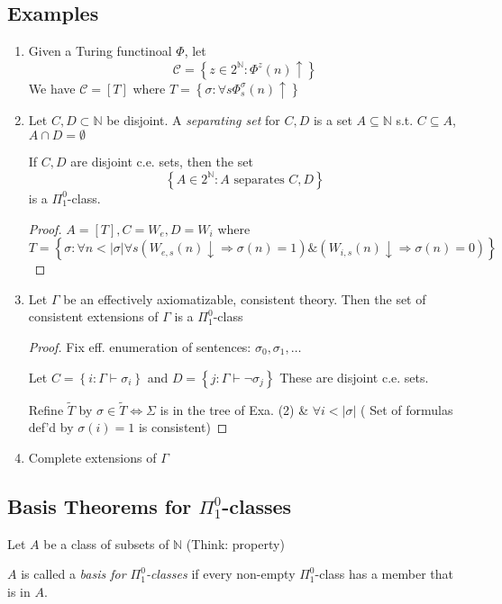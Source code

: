 \documentclass[12pt]{article}
\newcommand{\Nat}{\ensuremath{\mathbb{N}}}
\newcommand{\proves}{\vdash}
\begin{document}
\subsection{Examples}
\begin{enumerate}
  \item Given a Turing functinoal $\Phi$, let
\[
\mathcal{C} = \left\{ z \in 2^\Nat : \Phi^z(n) \uparrow \right\}
\]
We have $\mathcal{C} = [T]$ where $T = \left\{ \sigma:\forall s \Phi^\sigma_s(n) \uparrow \right\}$
  \item Let $C,D \subset \Nat$ be disjoint.
    A \emph{separating set} for $C,D$ is a set $A \subseteq \Nat$
    s.t. $C \subseteq A$, $A \cap D = \emptyset$

If $C,D$ are disjoint c.e. sets, then the set
\[
\left\{ A \in 2^\Nat : A \text{ separates } C,D \right\}
\]
is a $\Pi^0_1$-class.
\begin{proof}
  $A = [T], C = W_e, D = W_i $ where
  $T = \left\{ \sigma : \forall n < |\sigma| \forall s
  \left( W_{e,s}(n) \downarrow \Rightarrow \sigma(n) = 1 \right) \&
  \left( W_{i,s}(n) \downarrow \Rightarrow \sigma(n) = 0 \right)
  \right\}$
\end{proof}

  \item Let $\Gamma$ be an effectively axiomatizable,
    consistent theory.  Then the set of consistent extensions of $\Gamma$
    is a $\Pi^0_1$-class
\begin{proof}
  Fix eff. enumeration of sentences: $\sigma_0, \sigma_1, \dots$

  Let $C = \left\{ i : \Gamma \proves \sigma_i \right\}$
  and $D = \left\{ j : \Gamma \proves \neg\sigma_j \right\}$
  These are disjoint c.e. sets.

  Refine $\tilde{T}$ by $\sigma \in \tilde{T} \Leftrightarrow \Sigma$ is in
  the tree of Exa. (2)
  \& $\forall i < |\sigma|$ ( Set of formulas def'd by $\sigma(i) = 1$ is consistent)
\end{proof}

 \item Complete extensions of $\Gamma$
\end{enumerate}

\subsection{Basis Theorems for $\Pi^0_1$-classes}
Let $A$ be a class of subsets of $\Nat$ (Think: property)

$A$ is called a \emph{basis for $\Pi^0_1$-classes} if every non-empty
$\Pi^0_1$-class has a member that is in $A$.
\end{document}
